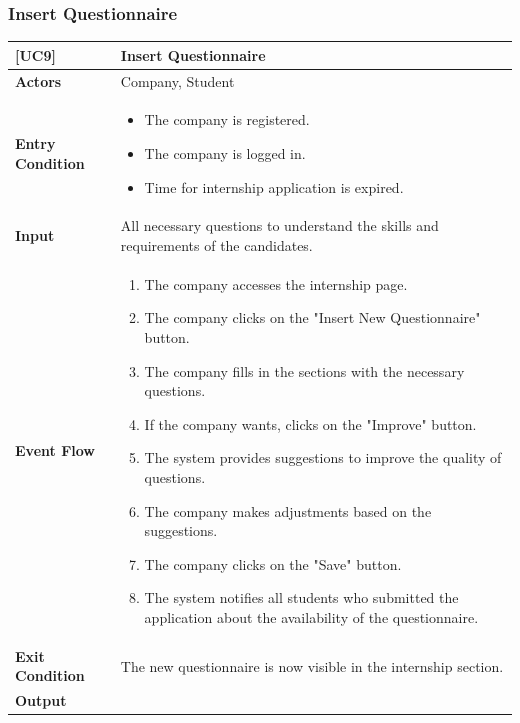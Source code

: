\subsubsection*{Insert Questionnaire}
\begin{table}[H]
    \centering
    \renewcommand{\arraystretch}{1.5}
    \begin{tabular}{|p{4cm}|p{11cm}|}
    \hline
    \rowcolor{bluepoli!40}
    \textbf{[UC9]} & \textbf{Insert Questionnaire} \\ \hline \hline
    \textbf{Actors} & Company, Student \\ \hline
    \textbf{Entry Condition} & 
    {\setlength{\leftmargini}{1.1em}
    \begin{itemize}
        \item The company is registered.
        \item The company is logged in.
        \item Time for internship application is expired.
    \end{itemize}} \\ \hline
    \textbf{Input} & 
    All necessary questions to understand the skills and requirements of the candidates. \\ \hline
    \textbf{Event Flow} & 
    {\setlength{\leftmargini}{1.4em}
    \begin{enumerate}
        \item The company accesses the internship page.
        \item The company clicks on the "Insert New Questionnaire" button.
        \item The company fills in the sections with the necessary questions.
        \item If the company wants, clicks on the "Improve" button.
        \item The system provides suggestions to improve the quality of questions.
        \item The company makes adjustments based on the suggestions.
        \item The company clicks on the "Save" button.
        \item The system notifies all students who submitted the application about the availability of the questionnaire.
    \end{enumerate}} \\ \hline
    \textbf{Exit Condition} & 
    The new questionnaire is now visible in the internship section. \\ \hline
    \textbf{Output} & 

\end{tabular}
\end{table}
